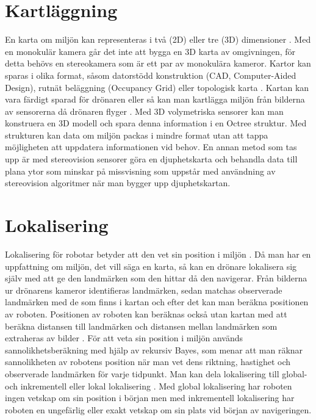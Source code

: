 \section{Kartläggning}

En karta om miljön kan representeras i två (2D) eller tre (3D) dimensioner \citep{geospatial}. Med en monokulär kamera går det inte att bygga en 3D karta av omgivningen, för detta behövs en stereokamera som är ett par av monokulära kameror. Kartor kan sparas i olika format, såsom datorstödd konstruktion (CAD, Computer-Aided Design), rutnät beläggning (Occupancy Grid) eller topologisk karta \citep{982903}. Kartan kan vara färdigt sparad för drönaren eller så kan man kartlägga miljön från bilderna av sensorerna då drönaren flyger \citep{geospatial}. Med 3D volymetriska sensorer kan man konstruera en 3D modell och spara denna information i en Octree struktur. Med strukturen kan data om miljön packas i mindre format utan att tappa möjligheten att uppdatera informationen vid behov. En annan metod som tas upp är med stereovision sensorer göra en djuphetskarta och behandla data till plana ytor som minskar på missvisning som uppstår med användning av stereovision algoritmer när man bygger upp djuphetskartan.

\section{Lokalisering}

Lokalisering för robotar betyder att den vet sin position i miljön \citep{982903}. Då man har en uppfattning om miljön, det vill säga en karta, så kan en drönare lokalisera sig själv med att ge den landmärken som den hittar då den navigerar. Från bilderna ur drönarens kameror identifieras landmärken, sedan matchas observerade landmärken med de som finns i kartan och efter det kan man beräkna positionen av roboten. Positionen av roboten kan beräknas också utan kartan med att beräkna distansen till landmärken och distansen mellan landmärken som extraheras av bilder \citep{realslamproblem}. För att veta sin position i miljön används sannolikhetsberäkning med hjälp av rekursiv Bayes, som menar att man räknar sannolikheten av robotens position när man vet dens riktning, hastighet och observerade landmärken för varje tidpunkt. Man kan dela lokalisering till global- och inkrementell eller lokal lokalisering \citep{982903, globalsubmaps}. Med global lokalisering har roboten ingen vetskap om sin position i början men med inkrementell lokalisering har roboten en ungefärlig eller exakt vetskap om sin plats vid början av navigeringen. 

